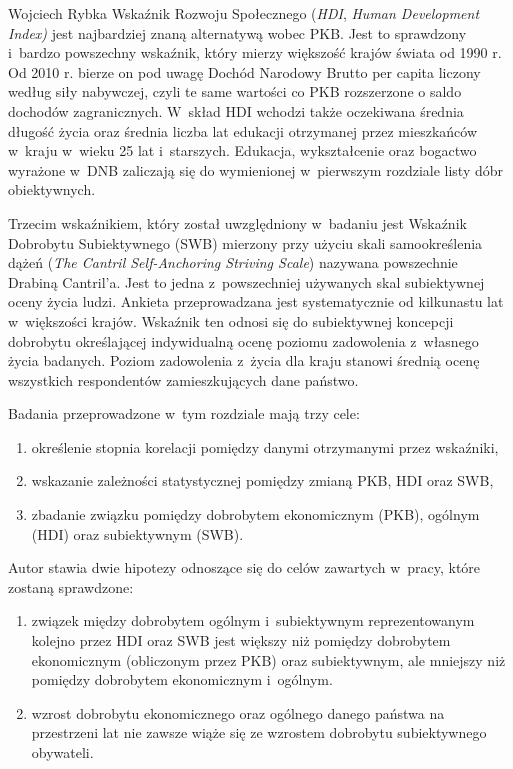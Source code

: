 \begin{artplenv}{Wojciech Rybka}
Wskaźnik Rozwoju Społecznego (\textit{HDI}, \textit{Human Development Index)} jest najbardziej znaną alternatywą wobec
PKB. Jest to sprawdzony i~bardzo powszechny wskaźnik, który mierzy większość krajów świata od 1990 r. Od 2010 r. bierze
on pod uwagę Dochód Narodowy Brutto per capita liczony według siły nabywczej, czyli te same wartości co PKB rozszerzone
o saldo dochodów zagranicznych. W~skład HDI wchodzi także oczekiwana średnia długość życia oraz średnia liczba lat
edukacji otrzymanej przez mieszkańców w~kraju w~wieku 25 lat i~starszych. Edukacja, wykształcenie oraz bogactwo
wyrażone w~DNB zaliczają się do wymienionej w~pierwszym rozdziale listy dóbr obiektywnych.

Trzecim wskaźnikiem, który został uwzględniony w~badaniu jest Wskaźnik Dobrobytu Subiektywnego (SWB) mierzony przy
użyciu skali samookreślenia dążeń (\textit{The Cantril Self-Anchoring Striving Scale}) nazywana powszechnie Drabiną
Cantril’a. Jest to jedna z~powszechniej używanych skal subiektywnej oceny życia ludzi. Ankieta przeprowadzana jest
systematycznie od kilkunastu lat w~większości krajów. Wskaźnik ten odnosi się do subiektywnej koncepcji dobrobytu
określającej indywidualną ocenę poziomu zadowolenia z~własnego życia badanych. Poziom zadowolenia z~życia dla kraju
stanowi średnią ocenę wszystkich respondentów zamieszkujących dane państwo.

Badania przeprowadzone w~tym rozdziale mają trzy cele:

\begin{enumerate}
\item określenie stopnia korelacji pomiędzy danymi otrzymanymi przez wskaźniki,
\item wskazanie zależności statystycznej pomiędzy zmianą PKB, HDI oraz SWB,
\item zbadanie związku pomiędzy dobrobytem ekonomicznym (PKB), ogólnym (HDI) oraz subiektywnym (SWB).
\end{enumerate}
Autor stawia dwie hipotezy odnoszące się do celów zawartych w~pracy, które zostaną sprawdzone:

\begin{enumerate}
\item związek między dobrobytem ogólnym i~subiektywnym reprezentowanym kolejno przez HDI oraz SWB jest większy niż
pomiędzy dobrobytem ekonomicznym (obliczonym przez PKB) oraz subiektywnym, ale mniejszy niż pomiędzy dobrobytem
ekonomicznym i~ogólnym.
\item wzrost dobrobytu ekonomicznego oraz ogólnego danego państwa na przestrzeni lat nie zawsze wiąże się ze wzrostem
dobrobytu subiektywnego obywateli.
\end{enumerate}

\end{artplenv}
